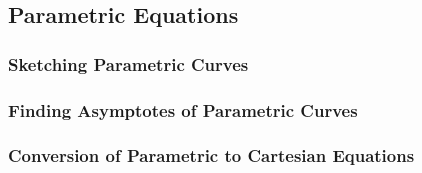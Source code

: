 \documentclass[../main.tex]{subfiles}
\begin{document}
\newpage \noindent

\subsection{Parametric Equations}


\subsubsection{Sketching Parametric Curves}


\subsubsection{Finding Asymptotes of Parametric Curves}


\subsubsection{Conversion of Parametric to Cartesian Equations}
\end{document}
